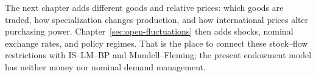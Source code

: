 The next chapter adds different goods and relative prices: which goods are
traded, how specialization changes production, and how international prices
alter purchasing power. Chapter~\ref{sec:open-fluctuations} then adds shocks,
nominal exchange rates, and policy regimes. That is the place to connect
these stock--flow restrictions with IS--LM--BP and Mundell--Fleming; the
present endowment model has neither money nor nominal demand management.


